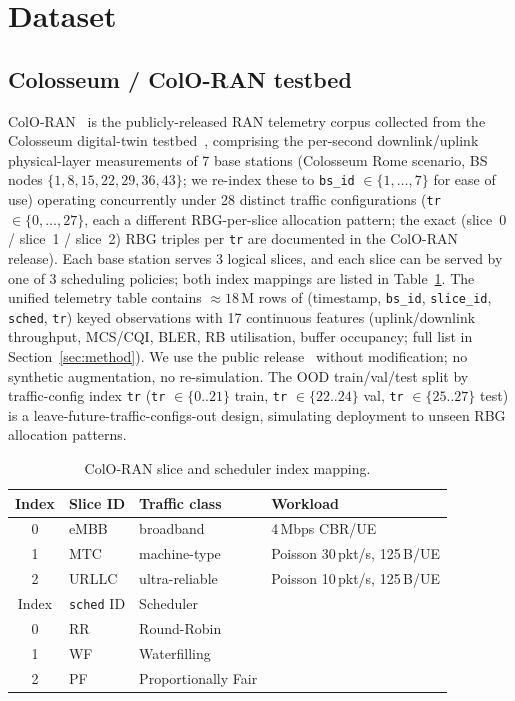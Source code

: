 \documentclass[journal]{IEEEtran}
\begin{document}
\section{Dataset}\label{sec:dataset}

\subsection{Colosseum / ColO-RAN testbed}

ColO-RAN~\cite{Polese2022} is the publicly-released RAN telemetry corpus collected from the Colosseum digital-twin testbed~\cite{Bonati2024}, comprising the per-second downlink/uplink physical-layer measurements of 7 base stations (Colosseum Rome scenario, BS nodes $\{1, 8, 15, 22, 29, 36, 43\}$; we re-index these to \lstinline|bs_id| $\in\{1, \ldots, 7\}$ for ease of use) operating concurrently under 28 distinct traffic configurations (\lstinline|tr| $\in\{0, \ldots, 27\}$, each a different RBG-per-slice allocation pattern; the exact (slice~0 / slice~1 / slice~2) RBG triples per \lstinline|tr| are documented in the ColO-RAN release). Each base station serves 3 logical slices, and each slice can be served by one of 3 scheduling policies; both index mappings are listed in Table~\ref{tab:dataset-mapping}. The unified telemetry table contains $\approx 18$\,M rows of (timestamp, \lstinline|bs_id|, \lstinline|slice_id|, \lstinline|sched|, \lstinline|tr|) keyed observations with 17 continuous features (uplink/downlink throughput, MCS/CQI, BLER, RB utilisation, buffer occupancy; full list in Section~\ref{sec:method}). We use the public release~\cite{wineslab_coloran_repo} without modification; no synthetic augmentation, no re-simulation. The OOD train/val/test split by traffic-config index \lstinline|tr| (\lstinline|tr| $\in \{0..21\}$ train, \lstinline|tr| $\in \{22..24\}$ val, \lstinline|tr| $\in \{25..27\}$ test) is a leave-future-traffic-configs-out design, simulating deployment to unseen RBG allocation patterns.

\begin{table}[t]
\caption{ColO-RAN slice and scheduler index mapping.}
\label{tab:dataset-mapping}
\centering
\begin{tabular}{@{}clll@{}}
\toprule
Index & Slice ID & Traffic class & Workload \\
\midrule
0 & eMBB  & broadband      & 4\,Mbps CBR/UE \\
1 & MTC   & machine-type   & Poisson 30\,pkt/s, 125\,B/UE \\
2 & URLLC & ultra-reliable & Poisson 10\,pkt/s, 125\,B/UE \\
\midrule
Index & \lstinline|sched| ID & Scheduler & \\
\midrule
0 & RR & Round-Robin          & \\
1 & WF & Waterfilling         & \\
2 & PF & Proportionally Fair  & \\
\bottomrule
\end{tabular}
\end{table}
\end{document}

